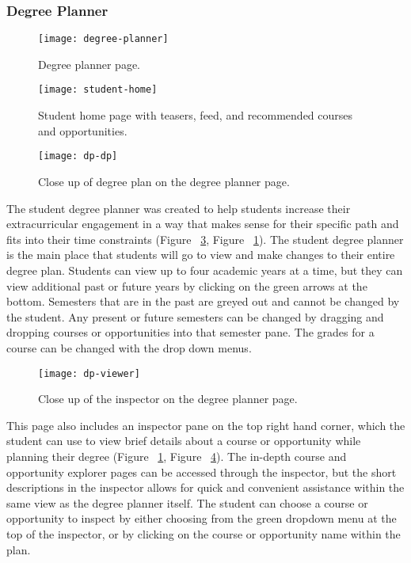 \subsubsection{Degree Planner}
\begin{figure}[htbp!]
\centering
\texttt{[image: degree-planner]}
\caption{Degree planner page.}
\label{degree-planner-page}
\end{figure}

\begin{figure}[htbp!]
\centering
\texttt{[image: student-home]}
\caption{Student home page with teasers, feed, and recommended courses and opportunities.}
\label{student-home-page}
\end{figure}

\begin{figure}[htbp!]
\centering
\texttt{[image: dp-dp]}
\caption{Close up of degree plan on the degree planner page.}
\label{degree-planner}
\end{figure}

The student degree planner was created to help students increase their extracurricular engagement in a way that makes sense for their specific path and fits into their time constraints (Figure ~\ref{degree-planner}, Figure ~\ref{degree-planner-page}). The student degree planner is the main place that students will go to view and make changes to their entire degree plan. Students can view up to four academic years at a time, but they can view additional past or future years by clicking on the green arrows at the bottom. Semesters that are in the past are greyed out and cannot be changed by the student. Any present or future semesters can be changed by dragging and dropping courses or opportunities into that semester pane. The grades for a course can be changed with the drop down menus. 

\begin{figure}[htbp!]
\centering
\texttt{[image: dp-viewer]}
\caption{Close up of the inspector on the degree planner page.}
\label{inspector}
\end{figure}

This page also includes an inspector pane on the top right hand corner, which the student can use to view brief details about a course or opportunity while planning their degree (Figure ~\ref{degree-planner-page}, Figure ~\ref{inspector}). The in-depth course and opportunity explorer pages can be accessed through the inspector, but the short descriptions in the inspector allows for quick and convenient assistance within the same view as the degree planner itself. The student can choose a course or opportunity to inspect by either choosing from the green dropdown menu at the top of the inspector, or by clicking on the course or opportunity name within the plan. 

